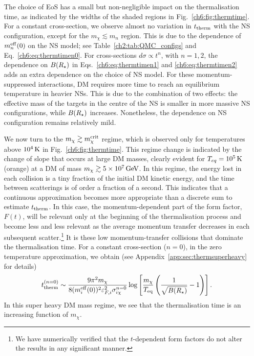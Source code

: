 The choice of EoS has a small but non-negligible impact on the thermalisation time, as indicated by the widths of the shaded regions in Fig.~\ref{ch6:fig:thermtime}. 
For a constant cross-section, we observe almost no variation in $t_{\rm therm}$ with the NS configuration, except for the $m_\chi \lesssim m_n$ region. This is due to the dependence of $m_n^{\rm eff}(0)$ on the NS model; see Table~\ref{ch2:tab:QMC_configs} and Eq.~\ref{ch6:eq:thermtimen0}.
For cross-sections $d\sigma\propto t^n$, with $n=1,2$, the dependence on $B(R_\star)$ in Eqs.~\ref{ch6:eq:thermtimen1} and \ref{ch6:eq:thermtimen2} adds an extra dependence on the choice of NS model. For these momentum-suppressed interactions, DM requires more time to reach an equilibrium temperature in heavier NSs. This is due to the combination of two effects: the effective mass of the targets in the centre of the NS is smaller in more massive NS configurations, while $B(R_\star)$ increases. Nonetheless, the dependence on NS configuration remains relatively mild. 




We now turn to the $m_\chi \gtrsim m_\chi^{\rm crit}$ regime, which is observed only for temperatures above $10^4{\rm \,K}$ in Fig.~\ref{ch6:fig:thermtime}. This regime change is indicated by the change of slope that occurs at large DM masses, clearly evident for  $T_{eq}=10^5{\rm \,K}$ (orange)  at a DM of mass $m_\chi\gtrsim5\times10^7{\rm \,GeV}$.  
In this regime, the energy lost in each collision is a tiny fraction of the initial DM kinetic energy, and the time between scatterings is of order a fraction of a second. This indicates that a continuous approximation becomes more appropriate than a discrete sum to estimate $t_{\rm therm}$.
In this case, the momentum-dependent part of the form factor, $F(t)$, will be relevant only at the beginning of the thermalisation process and become less and less relevant as the average momentum transfer decreases in each subsequent scatter.\footnote{We have numerically verified that the $t$-dependent form factors do not alter the results in any significant manner.} It is these low momentum-transfer collisions that dominate the thermalisation time.
%
For a constant cross-section ($n=0$), in the zero temperature approximation, we obtain 
(see Appendix~\ref{app:sec:thermsuperheavy} for details)
\begin{equation}
    \tthn{0} \sim \frac{9 \pi^2 m_\chi}{8 (\mbeff(0))^2 \kinFi^2 \sigma_{i\chi}^{n=0} }\log\left[\frac{m_\chi}{T_{\rm eq}}\left(\frac{1}{\sqrt{B(\Rstar)}}-1\right)\right]. %
\label{ch6:eq:tthemheavy0text}
\end{equation}
In this super heavy DM mass regime, we see that the thermalisation time is an increasing function of $m_\chi$. 


